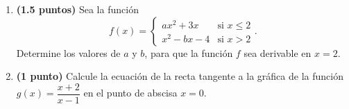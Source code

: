 
\begin{enumerate}[label=\alph*)]
\item \textbf{(1.5 puntos)} Sea la función
\[
f(x)=\begin{cases}
ax^2+3x&\text{si }x\leq2\\
x^2-bx-4&\text{si }x>2
\end{cases}.
\]
Determine los valores de $a$ y $b$, para que la función $f$ sea derivable en $x=2$.
\item \textbf{(1 punto)} Calcule la ecuación de la recta tangente a la gráfica de la función $g(x)=\dfrac{x+2}{x-1}$ en el punto de abscisa $x=0$.
\end{enumerate}
